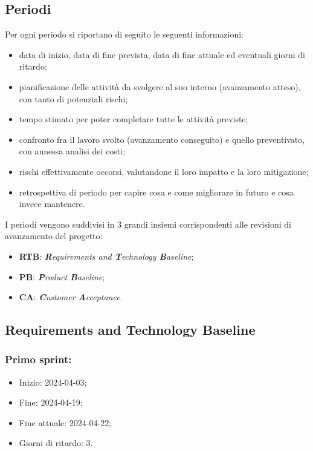 \subsection{Periodi}
Per ogni periodo si riportano di seguito le seguenti informazioni:
\begin{itemize}
    \item data di inizio, data di fine prevista, data di fine attuale ed eventuali giorni di ritardo;
    \item pianificazione delle attività da svolgere al suo interno (avanzamento atteso), con tanto di potenziali rischi;
    \item tempo stimato per poter completare tutte le attività previste;
    \item confronto fra il lavoro svolto (avanzamento conseguito) e quello preventivato, con annessa analisi dei costi;
    \item rischi effettivamente occorsi, valutandone il loro impatto e la loro mitigazione;
    \item retrospettiva di periodo per capire cosa e come migliorare in futuro e cosa invece mantenere.
\end{itemize}
I periodi vengono suddivisi in 3 grandi insiemi corrispondenti alle revisioni di avanzamento del progetto:
\begin{itemize}
    \item \textbf{RTB}: \textit{\textbf{R}equirements and \textbf{T}echnology \textbf{B}aseline};
    \item \textbf{PB}:  \textit{\textbf{P}roduct \textbf{B}aseline};
    \item \textbf{CA}:  \textit{\textbf{C}ustomer \textbf{A}cceptance}.
\end{itemize}

\subsection{Requirements and Technology Baseline}
\subsubsection{Primo sprint:}
\begin{itemize}
    \item Inizio: 2024-04-03;
    \item Fine: 2024-04-19;
    \item Fine attuale: 2024-04-22;
    \item Giorni di ritardo: 3.
\end{itemize}

